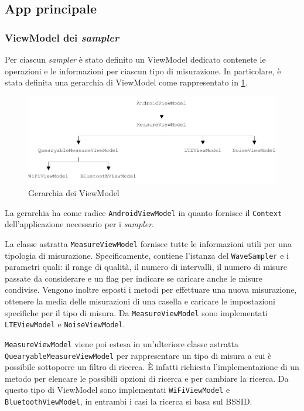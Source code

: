 \subsection{App principale}

\subsubsection{ViewModel dei \textit{sampler}}
Per ciascun \textit{sampler} è stato definito un ViewModel dedicato contenete le operazioni e le informazioni per ciascun tipo di misurazione.
In particolare, è stata definita una gerarchia di ViewModel come rappresentato in \cref{fig:viewmodel_hierarchy}.

\begin{figure}[H]
  \centering
  \includegraphics[width=\textwidth]{./img/viewmodel.pdf}
  \caption{Gerarchia dei ViewModel} \label{fig:viewmodel_hierarchy}
\end{figure}

La gerarchia ha come radice \texttt{AndroidViewModel} in quanto fornisce il \texttt{Context} dell'applicazione necessario per i \textit{sampler}.

La classe astratta \texttt{MeasureViewModel} fornisce tutte le informazioni utili per una tipologia di misurazione. Specificamente, contiene l'istanza del \texttt{WaveSampler} e i parametri quali: il range di qualità, il numero di intervalli, il numero di misure passate da considerare e un flag per indicare se caricare anche le misure condivise.
Vengono inoltre esposti i metodi per effettuare una nuova misurazione, ottenere la media delle misurazioni di una casella e caricare le impostazioni specifiche per il tipo di misura.
Da \texttt{MeasureViewModel} sono implementati \texttt{LTEViewModel} e \texttt{NoiseViewModel}.

\texttt{MeasureViewModel} viene poi estesa in un'ulteriore classe astratta \texttt{QuearyableMeasureViewModel} per rappresentare un tipo di misura a cui è possibile sottoporre un filtro di ricerca. È infatti richiesta l'implementazione di un metodo per elencare le possibili opzioni di ricerca e per cambiare la ricerca. Da questo tipo di ViewModel sono implementati \texttt{WiFiViewModel} e \texttt{BluetoothViewModel}, in entrambi i casi la ricerca si basa sul BSSID.


